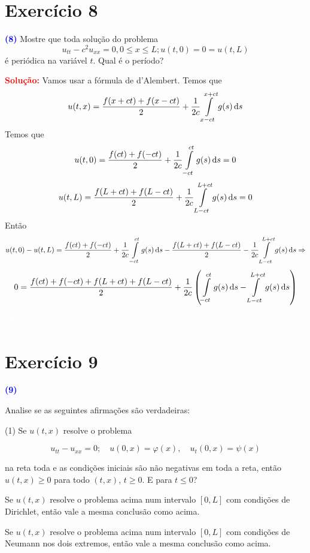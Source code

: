\documentclass[11pt,a4paper]{article}
\newcommand{\exercicio}[1]{\section*{Exercício #1} \textcolor{blue}{\bf(#1)}}
\newcommand{\dividiritens}[1]{\begin{tasks}[counter-format={(tsk[a])},label-width=3.6ex, label-format = {\bfseries}, column-sep = {0pt}](1) #1 \end{tasks}}
\newcommand{\pers}[1]{\textcolor{Floresta}{$\negrito{(#1)} $}}
\newcommand{\solucao}[1]{\begin{mdframed}[style=MyFrame]
\textbf{\textcolor{red}{Solução:}} #1
\end{mdframed}\textcolor{white}{Oi} \newline}
\begin{document}
\exercicio{8}
Mostre que toda solução do problema
\[u_{tt} - c^2u_{xx} = 0, 0 \le x \le L; u(t, 0) = 0 = u(t, L)\]
é periódica na variável $t.$ Qual é o período?

\solucao{
Vamos usar a fórmula de d'Alembert. Temos que
\[
u(t,x) = \frac{f(x + ct) + f(x - ct)}{2} + \frac{1}{2c} \int\limits_{x  -ct}^{x + ct} g(s) \dif s
\]
Temos que
\[
u(t,0) = \frac{f(ct) + f(-ct)}{2} + \frac{1}{2c} \int\limits_{-ct}^{ct} g(s) \dif s  = 0
\]
\[
u(t,L) = \frac{f(L+ct) + f(L-ct)}{2} + \frac{1}{2c} \int\limits_{L-ct}^{L+ct} g(s) \dif s  = 0
\]
Então
\[u(t,0) - u(t,L) = \frac{f(ct) + f(-ct)}{2} + \frac{1}{2c} \int\limits_{-ct}^{ct} g(s) \dif s  - \frac{f(L+ct) + f(L-ct)}{2} - \frac{1}{2c} \int\limits_{L-ct}^{L+ct} g(s) \dif s \Rightarrow
\]
\[
0 = \frac{f(ct) + f(-ct) + f(L+ct) + f(L-ct)}{2} + \frac{1}{2c} \left(\int\limits_{-ct}^{ct} g(s) \dif s - \int\limits_{L-ct}^{L+ct} g(s) \dif s \right)
\]
}

\exercicio{9}

Analise se as seguintes afirmações são verdadeiras:

\dividiritens{
\task[\pers{a}]  Se $u(t,x)$ resolve o problema

\[
u_{tt} - u_{xx} = 0; \quad u(0, x) = \varphi(x), \quad u_t(0, x) = \psi(x)
\]

\noindent
na reta toda e as condições iniciais são não negativas em toda a reta, então
$u(t, x) \geq 0$ para todo $(t, x)$, $t \geq 0$. E para $t \leq 0$?

\task[\pers{b}] Se $u(t, x)$ resolve o problema acima num intervalo $[0, L]$ com condições de Dirichlet, então vale a mesma conclusão como acima.

\task[\pers{c}] Se $u(t, x)$ resolve o problema acima num intervalo $[0, L]$ com condições de Neumann nos dois extremos, então vale a mesma conclusão como acima.}
\end{document}
